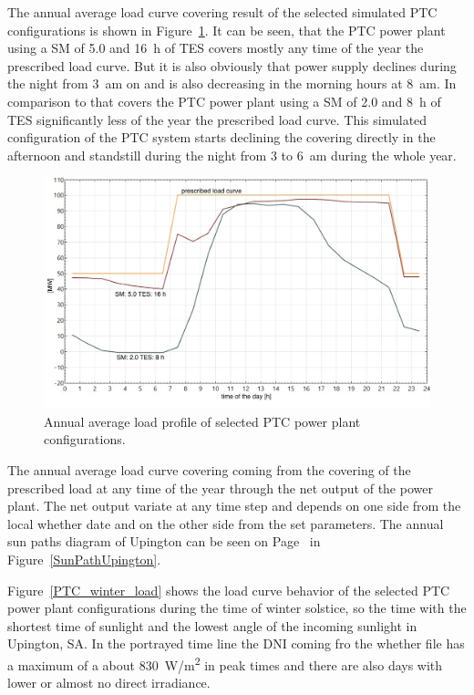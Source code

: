 The annual average load curve covering result of the selected simulated PTC configurations is shown in Figure~\ref{PTC_annual_profil}. It can be seen, that the PTC power plant using a SM of 5.0 and 16~h of TES covers mostly any time of the year the prescribed load curve. But it is also obviously that power supply declines during the night from 3~am on and is also decreasing in the morning hours at 8~am. In comparison to that covers the PTC power plant using a SM of 2.0 and 8~h of TES significantly less of the year the prescribed load curve. This simulated configuration of the PTC system starts declining the covering directly in the afternoon and standstill during the night from 3 to 6~am during the whole year.

\begin{figure}[htbp]  
\centering
\includegraphics[width=0.8\linewidth]{FIG/PTC_annual_profil}
\caption[Annual average load profile of selected PTC power plant configurations.]{Annual average load profile of selected PTC power plant configurations.}\label{PTC_annual_profil}
\end{figure}
The annual average load curve covering coming from the covering of the prescribed load at any time of the year through the net output of the power plant. The net output variate at any time step and depends on one side from the local whether date and on the other side from the set parameters. The annual sun paths diagram of Upington can be seen on Page~\pageref{SunPathUpington} in Figure~\ref{SunPathUpington}. 

Figure~\ref{PTC_winter_load} shows the load curve behavior of the selected PTC power plant configurations during the time of winter solstice, so the time with the shortest time of sunlight and the lowest angle of the incoming sunlight in Upington, SA. In the portrayed time line the DNI coming fro the whether file has a maximum of a about 830~W/m\textsuperscript{2} in peak times and there are also days with lower or almost no direct irradiance. 

